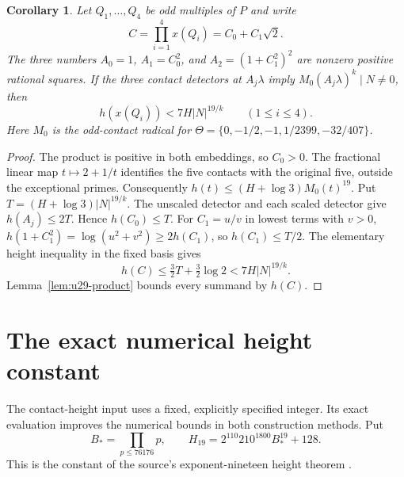 \documentclass[11pt,a4paper]{article}
\newtheorem{corollary}[theorem]{Corollary}
\theoremstyle{definition}
\theoremstyle{remark}
\begin{document}
\begin{corollary}\label{cor:u29-scales}
Let $Q_1,\ldots,Q_4$ be odd multiples of $P$ and write
\[
 C=\prod_{i=1}^4x(Q_i)=C_0+C_1\sqrt2.
\]
The three numbers $A_0=1$, $A_1=C_0^2$, and
$A_2=(1+C_1^2)^2$ are nonzero positive rational squares.
If the three contact detectors at $A_j\lambda$ imply
$M_0(A_j\lambda)^k\mid N\ne0$, then
\[
                         h(x(Q_i))<7H|N|^{19/k}
                         \qquad(1\le i\le4).
\]
Here $M_0$ is the odd-contact radical for
$\Theta=\{0,-1/2,-1,1/2399,-32/407\}$.
\end{corollary}
\begin{proof}
The product is positive in both embeddings, so $C_0>0$.
The fractional linear map $t\mapsto2+1/t$ identifies the five
contacts with the original five, outside the exceptional primes.
Consequently $h(t)\le(H+\log3)M_0(t)^{19}$.  Put
$T=(H+\log3)|N|^{19/k}$.  The unscaled detector and each scaled
detector give $h(A_j)\le2T$.  Hence $h(C_0)\le T$.
For $C_1=u/v$ in lowest terms with $v>0$,
$h(1+C_1^2)=\log(u^2+v^2)\ge2h(C_1)$, so $h(C_1)\le T/2$.
The elementary height inequality in the fixed basis gives
\[
 h(C)\le\tfrac32T+\tfrac32\log2<7H|N|^{19/k}.
\]
Lemma~\ref{lem:u29-product} bounds every summand by $h(C)$.
\end{proof}

\section{The exact numerical height constant}
\label{sec:exact-height-constant}

The contact-height input uses a fixed, explicitly specified integer.
Its exact evaluation improves the numerical bounds in both construction
methods. Put
\[
 B_*=\prod_{p\le76176}p,\qquad
 H_{19}=2^{110}210^{1800}B_*^{19}+128.
\]
This is the constant of the source's exponent-nineteen height theorem
\cite[Theorem \nolinkurl{thm:quartic-height19}]{RepositoryV9}.
\end{document}
